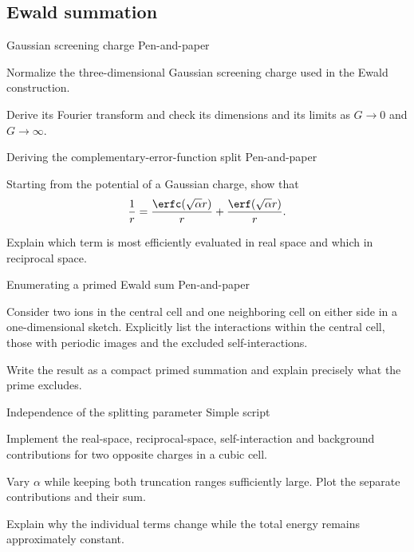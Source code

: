 %
%
%
\subsection{Ewald summation}

\begin{exci}{Gaussian screening charge \hfill\textnormal{\small Pen-and-paper}}
    \item Normalize the three-dimensional Gaussian screening charge used in
    the Ewald construction.
    \item Derive its Fourier transform and check its dimensions and its limits
    as $G\rightarrow0$ and $G\rightarrow\infty$.
\end{exci}

\begin{exci}{Deriving the complementary-error-function split \hfill\textnormal{\small Pen-and-paper}}
    \item Starting from the potential of a Gaussian charge, show that
    \begin{equation*}
        \frac{1}{r}=
        \frac{\erfc(\sqrt{\alpha}r)}{r}
        +\frac{\erf(\sqrt{\alpha}r)}{r}.
    \end{equation*}
    \item Explain which term is most efficiently evaluated in real space and
    which in reciprocal space.
\end{exci}

\begin{exci}{Enumerating a primed Ewald sum \hfill\textnormal{\small Pen-and-paper}}
    \item Consider two ions in the central cell and one neighboring cell on
    either side in a one-dimensional sketch. Explicitly list the interactions
    within the central cell, those with periodic images and the excluded
    self-interactions.
    \item Write the result as a compact primed summation and explain precisely
    what the prime excludes.
\end{exci}

\begin{exci}{Independence of the splitting parameter \hfill\textnormal{\small Simple script}}
    \item Implement the real-space, reciprocal-space, self-interaction and
    background contributions for two opposite charges in a cubic cell.
    \item Vary $\alpha$ while keeping both truncation ranges sufficiently
    large. Plot the separate contributions and their sum.
    \item Explain why the individual terms change while the total energy
    remains approximately constant.
\end{exci}

